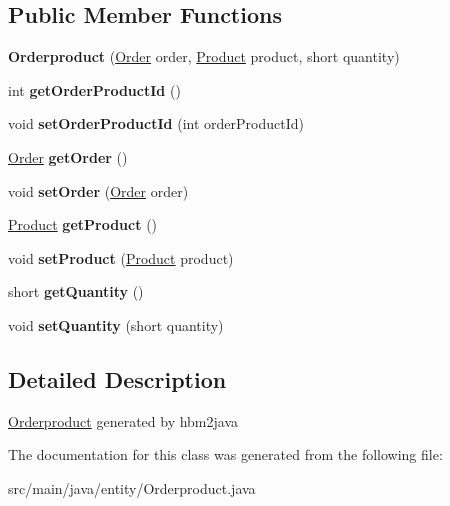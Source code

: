 \subsection*{Public Member Functions}
\begin{DoxyCompactItemize}
\item 
\mbox{\label{classentity_1_1_orderproduct_a141723329278c6424a1d300db29529a4}} 
{\bfseries Orderproduct} (\mbox{\hyperlink{classentity_1_1_order}{Order}} order, \mbox{\hyperlink{classentity_1_1_product}{Product}} product, short quantity)
\item 
\mbox{\label{classentity_1_1_orderproduct_a08d3bfc82478033cba0386026800358b}} 
int {\bfseries get\+Order\+Product\+Id} ()
\item 
\mbox{\label{classentity_1_1_orderproduct_afb5336d8fb886081876eb8b69970daad}} 
void {\bfseries set\+Order\+Product\+Id} (int order\+Product\+Id)
\item 
\mbox{\label{classentity_1_1_orderproduct_af160d989a7a8c448ce983743a8ee1578}} 
\mbox{\hyperlink{classentity_1_1_order}{Order}} {\bfseries get\+Order} ()
\item 
\mbox{\label{classentity_1_1_orderproduct_ac38152f038c0669a8f2280c6f55fc1bb}} 
void {\bfseries set\+Order} (\mbox{\hyperlink{classentity_1_1_order}{Order}} order)
\item 
\mbox{\label{classentity_1_1_orderproduct_ac8a5d534f8433a8260ea87a85bb00217}} 
\mbox{\hyperlink{classentity_1_1_product}{Product}} {\bfseries get\+Product} ()
\item 
\mbox{\label{classentity_1_1_orderproduct_a4d9fd082a96c982443e6ad4cfb032a61}} 
void {\bfseries set\+Product} (\mbox{\hyperlink{classentity_1_1_product}{Product}} product)
\item 
\mbox{\label{classentity_1_1_orderproduct_a4a10cb8ecd7ac4c692f5f3fa96793e9d}} 
short {\bfseries get\+Quantity} ()
\item 
\mbox{\label{classentity_1_1_orderproduct_ab402591f6605ff9ad60a62175b4e6d0d}} 
void {\bfseries set\+Quantity} (short quantity)
\end{DoxyCompactItemize}


\subsection{Detailed Description}
\mbox{\hyperlink{classentity_1_1_orderproduct}{Orderproduct}} generated by hbm2java 

The documentation for this class was generated from the following file\+:\begin{DoxyCompactItemize}
\item 
src/main/java/entity/Orderproduct.\+java\end{DoxyCompactItemize}
